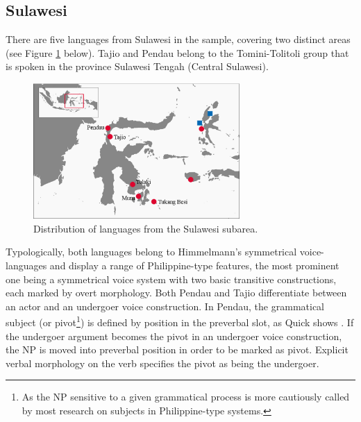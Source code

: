 \subsection{Sulawesi}

There are five languages from Sulawesi in the sample, covering two distinct areas (see Figure \ref{map:Sul} below). Tajio and Pendau belong to the Tomini-Tolitoli group that is spoken in the province Sulawesi Tengah (Central Sulawesi). 

\begin{figure}
\includegraphics[width=0.7\textwidth]{figures/Map_Sulawesi2.eps}
\caption{Distribution of languages from the Sulawesi subarea.}\label{map:Sul}

\end{figure}

Typologically, both languages belong to Himmelmann's symmetrical voice-languages and display a range of Philippine-type features, the most prominent one being a symmetrical voice system with two basic transitive constructions, each marked by overt morphology. Both Pendau and Tajio differentiate between an actor and an undergoer voice construction. In Pendau, the grammatical subject (or pivot\footnote{As the NP sensitive to a given grammatical process is more cautiously called by most research on subjects in Philippine-type systems.}) is defined by position in the preverbal slot, as Quick shows \citep[124]{Quick2007}. If the undergoer argument becomes the pivot in an undergoer voice construction, the NP is moved into preverbal position in order to be marked as pivot. Explicit verbal morphology on the verb specifies the pivot as being the undergoer.

